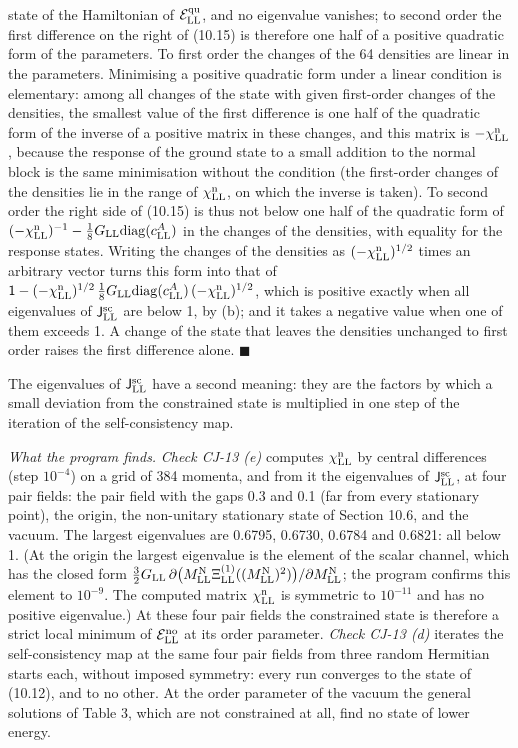 \documentclass[
  10pt,
]{article}
\begin{document}
state of the Hamiltonian of \(\mathcal E^{\rm qu}_{\rm LL}\), and no
eigenvalue vanishes; to second order the first difference on the right
of (10.15) is therefore one half of a positive quadratic form of the
parameters. To first order the changes of the 64 densities are linear in
the parameters. Minimising a positive quadratic form under a linear
condition is elementary: among all changes of the state with given
first-order changes of the densities, the smallest value of the first
difference is one half of the quadratic form of the inverse of a
positive matrix in these changes, and this matrix is
\(-\chi^{\rm n}_{\rm LL}\), because the response of the ground state to
a small addition to the normal block is the same minimisation without
the condition (the first-order changes of the densities lie in the range
of \(\chi^{\rm n}_{\rm LL}\), on which the inverse is taken). To second
order the right side of (10.15) is thus not below one half of the
quadratic form of
\((-\chi^{\rm n}_{\rm LL})^{-1}-\tfrac18G_{\rm LL}\mathrm{diag}(c^A_{\rm LL})\)
in the changes of the densities, with equality for the response states.
Writing the changes of the densities as
\((-\chi^{\rm n}_{\rm LL})^{1/2}\) times an arbitrary vector turns this
form into that of
\(\mathsf 1-(-\chi^{\rm n}_{\rm LL})^{1/2}\,\tfrac18G_{\rm LL}\mathrm{diag}(c^A_{\rm LL})\,(-\chi^{\rm n}_{\rm LL})^{1/2}\),
which is positive exactly when all eigenvalues of
\(\mathsf J^{\rm sc}_{\rm LL}\) are below 1, by (b); and it takes a
negative value when one of them exceeds 1. A change of the state that
leaves the densities unchanged to first order raises the first
difference alone. \(\blacksquare\)

The eigenvalues of \(\mathsf J^{\rm sc}_{\rm LL}\) have a second
meaning: they are the factors by which a small deviation from the
constrained state is multiplied in one step of the iteration of the
self-consistency map.

\emph{What the program finds.} \emph{Check CJ-13 (e)} computes
\(\chi^{\rm n}_{\rm LL}\) by central differences (step \(10^{-4}\)) on a
grid of 384 momenta, and from it the eigenvalues of
\(\mathsf J^{\rm sc}_{\rm LL}\), at four pair fields: the pair field
with the gaps 0.3 and 0.1 (far from every stationary point), the origin,
the non-unitary stationary state of Section 10.6, and the vacuum. The
largest eigenvalues are 0.6795, 0.6730, 0.6784 and 0.6821: all below 1.
(At the origin the largest eigenvalue is the element of the scalar
channel, which has the closed form
\(\tfrac32G_{\rm LL}\,\partial\big(M^{\rm N}_{\rm LL}\Xi^{(1)}_{\rm LL}((M^{\rm N}_{\rm LL})^2)\big)/\partial M^{\rm N}_{\rm LL}\);
the program confirms this element to \(10^{-9}\). The computed matrix
\(\chi^{\rm n}_{\rm LL}\) is symmetric to \(10^{-11}\) and has no
positive eigenvalue.) At these four pair fields the constrained state is
therefore a strict local minimum of \(\mathcal E^{\rm no}_{\rm LL}\) at
its order parameter. \emph{Check CJ-13 (d)} iterates the
self-consistency map at the same four pair fields from three random
Hermitian starts each, without imposed symmetry: every run converges to
the state of (10.12), and to no other. At the order parameter of the
vacuum the general solutions of Table 3, which are not constrained at
all, find no state of lower energy.
\end{document}
